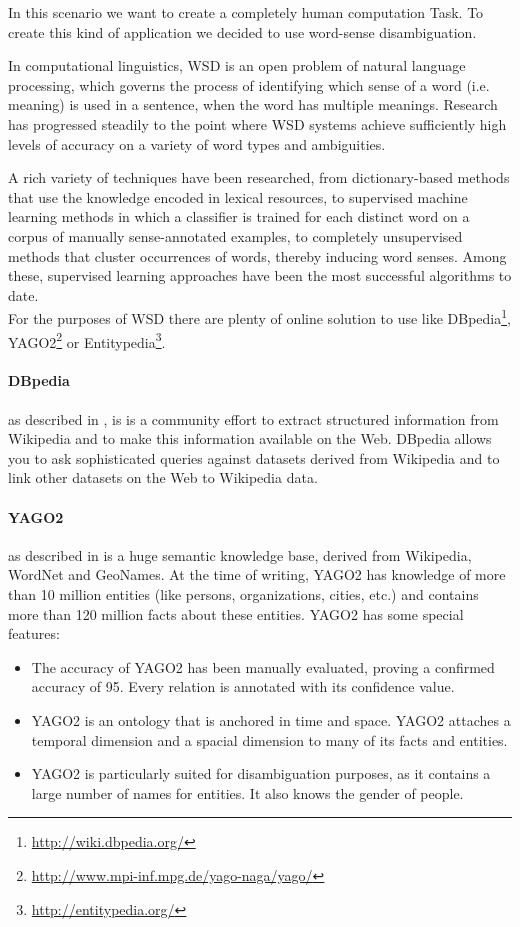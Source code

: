 In this scenario we want to create a completely human computation Task. To 
create this kind of application we decided to use word-sense disambiguation.

In computational linguistics, \ac{WSD} is an open problem of natural language
processing, which governs the process of identifying which sense of a word
(i.e. meaning) is used in a sentence, when the word has multiple meanings.
Research has progressed steadily to the point where \ac{WSD} systems achieve
sufficiently high levels of accuracy on a variety of word types and ambiguities.

A rich variety of techniques have been researched, from dictionary-based methods
that use the knowledge encoded in lexical resources, to supervised machine
learning methods in which a classifier is trained for each distinct word on a
corpus of manually sense-annotated examples, to completely unsupervised methods
that cluster occurrences of words, thereby inducing word senses. Among these,
supervised learning approaches have been the most successful algorithms to date.\\

For the purposes of \ac{WSD} there are plenty of online solution to use like
DBpedia\footnote{\url{http://wiki.dbpedia.org/}},
YAGO2\footnote{\url{http://www.mpi-inf.mpg.de/yago-naga/yago/}} or
Entitypedia\footnote{\url{http://entitypedia.org/}}.


\paragraph{DBpedia} as described in \cite{auer2007dbpedia}, is is a community
effort to extract structured information from Wikipedia and to make this
information available on the Web. DBpedia allows you to ask sophisticated queries
against datasets derived from Wikipedia and to link other datasets on the Web to
Wikipedia data.

\paragraph{YAGO2} as described in \cite{hoffart2010yago2} is a huge semantic
knowledge base, derived from Wikipedia, WordNet and GeoNames. At the time of
writing, YAGO2 has knowledge of more than 10 million entities (like persons,
organizations, cities, etc.) and contains more than 120 million facts about these
entities. YAGO2 has some special features:
\begin{itemize}
    \item The accuracy of YAGO2 has been manually evaluated, proving a confirmed
    accuracy of 95. Every relation is annotated with its confidence value.
    \item YAGO2 is an ontology that is anchored in time and space. YAGO2 attaches
    a temporal dimension and a spacial dimension to many of its facts and entities.
    \item YAGO2 is particularly suited for disambiguation purposes, as it
    contains a large number of names for entities. It also knows the gender of
    people.
\end{itemize}

